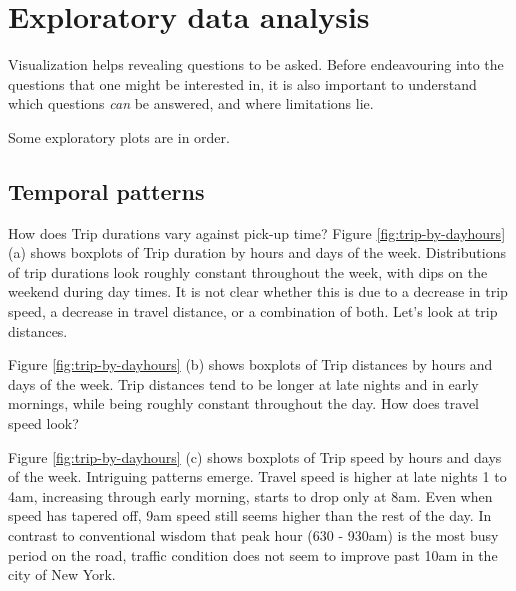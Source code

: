 \documentclass[10pt,a4paper]{article} %
\begin{document}
{    
    
    
    \section{Exploratory data analysis}
    
    Visualization helps revealing questions to be asked. Before endeavouring into the questions that one might be interested in, it is also important to understand which questions \emph{can} be answered, and where limitations lie.
    
    Some exploratory plots are in order.
    
    \subsection{Temporal patterns}
    
    How does Trip durations vary against pick-up time? Figure \ref{fig:trip-by-dayhours} (a) shows boxplots of Trip duration by hours and days of the week. Distributions of trip durations look roughly constant throughout the week, with dips on the weekend during day times. It is not clear whether this is due to a decrease in trip speed, a decrease in travel distance, or a combination of both. Let's look at trip distances.
    
    Figure \ref{fig:trip-by-dayhours} (b) shows boxplots of Trip distances by hours and days of the week. Trip distances tend to be longer at late nights and in early mornings, while being roughly constant throughout the day. How does travel speed look?
    
    Figure \ref{fig:trip-by-dayhours} (c) shows boxplots of Trip speed by hours and days of the week. Intriguing patterns emerge.
    Travel speed is higher at late nights 1 to 4am, increasing through early morning, starts to drop only at 8am. Even when speed has tapered off, 9am speed still seems higher than the rest of the day.
    In contrast to conventional wisdom that peak hour (630 - 930am) is the most busy period on the road, traffic condition does not seem to improve past 10am in the city of New York. \\
    
}
\end{document}
